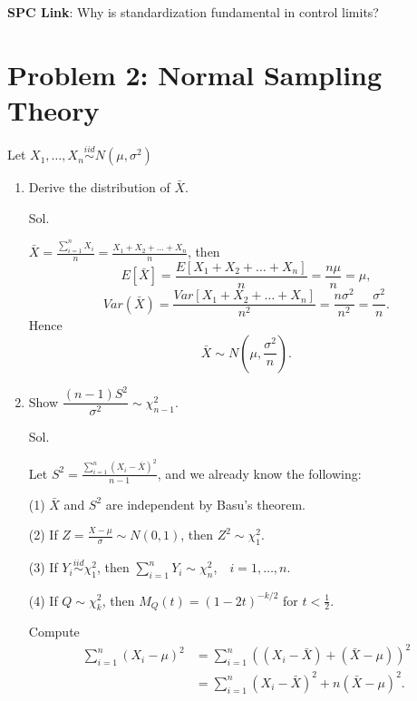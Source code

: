 \documentclass[a4paper, 12pt]{article}  %
\begin{document}
    \textbf{SPC Link}: Why is standardization fundamental in control limits?

\section*{Problem 2: Normal Sampling Theory}
Let $X_1,\dots,X_n \stackrel{iid}{\sim} N(\mu,\sigma^2)$
    \begin{enumerate}
        \item Derive the distribution of $\bar{X}$.
        
        Sol.

        $\bar{X}=\frac{\sum_{i=1}^n X_i}{n}=\frac{X_1+X_2+\dots +X_n}{n}$, then 
        $$E[\bar{X}]=\frac{E[X_1+X_2+\dots +X_n]}{n}=\frac{n\mu}{n}=\mu,$$
        $$Var(\bar{X})=\frac{Var[X_1+X_2+\dots +X_n]}{n^2}=\frac{n\sigma^2}{n^2}=\frac{\sigma^2}{n}.$$
        Hence $$\bar{X}\sim N\left(\mu,\frac{\sigma^2}{n}\right).$$

        \item Show $\dfrac{(n-1)S^2}{\sigma^2} \sim \chi^2_{n-1}$.
        
        Sol.
        
        Let $S^2=\frac{\sum_{i=1}^n(X_i-\bar X)^2}{n-1}$, and we already know the following:

        (1) $\bar X$ and $S^2$ are independent by Basu's theorem.

        (2) If $Z=\frac{X-\mu}{\sigma}\sim N(0,1)$, then $Z^2\sim \chi^2_1$.
        
        (3) If $Y_i\stackrel{iid}{\sim}\chi^2_1$, then $\sum_{i=1}^n Y_i\sim \chi^2_n$,　$i=1,\dots,n$.
        
        (4) If $Q\sim \chi^2_k$, then $M_Q(t)=(1-2t)^{-k/2}$ for $t<\frac{1}{2}$.
        
        Compute
        \begin{align*}
        \sum_{i=1}^n (X_i-\mu)^2
        &=\sum_{i=1}^n((X_i-\bar X)+(\bar X-\mu))^2 \\
        &=\sum_{i=1}^n (X_i-\bar X)^2 + n(\bar X-\mu)^2.
        \end{align*}


\end{enumerate}
\end{document}
